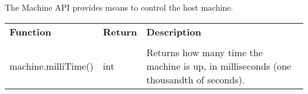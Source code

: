 The Machine API provides means to control the host machine.

\begin{tabularx}{\textwidth}{l l X}
	\textbf{\large Function} & \textbf{\large Return} & \textbf{\large Description}
	\\ \\
	\endhead
	machine.milliTime() & int & Returns how many time the machine is up, in milliseconds (one thousandth of seconds).
\end{tabularx}